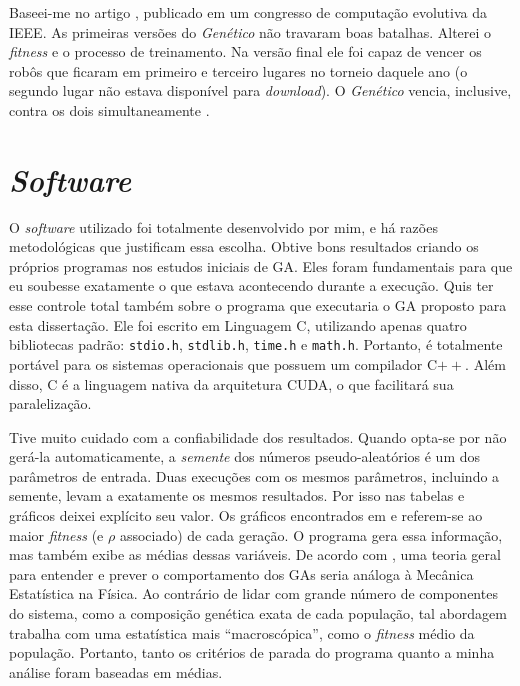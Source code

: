 	Baseei-me no artigo \cite{robocodeGA}, publicado em um congresso de computação evolutiva da IEEE. As primeiras versões do \emph{Genético} não travaram boas batalhas. Alterei o \emph{fitness} e o processo de treinamento. Na versão final ele foi capaz de vencer os robôs que ficaram em primeiro e terceiro lugares no torneio daquele ano (o segundo lugar não estava disponível para \emph{download}). O \emph{Genético} vencia, inclusive, contra os dois simultaneamente \cite{robocodeGA_adriano}.
	

\section{\emph{Software}}

	O \emph{software} utilizado foi totalmente desenvolvido por mim, e há razões metodológicas que justificam essa escolha. Obtive bons resultados criando os próprios programas nos estudos iniciais de GA. Eles foram fundamentais para que eu soubesse exatamente o que estava acontecendo durante a execução. Quis ter esse controle total também sobre o programa que executaria o GA proposto para esta dissertação. Ele foi escrito em Linguagem C, utilizando apenas quatro bibliotecas padrão: \texttt{stdio.h}, \texttt{stdlib.h}, \texttt{time.h} e \texttt{math.h}. Portanto, é totalmente portável para os sistemas operacionais que possuem um compilador C$++$. Além disso, C é a linguagem nativa da arquitetura CUDA, o que facilitará sua paralelização.
	
	Tive muito cuidado com a confiabilidade dos resultados. Quando opta-se por não gerá-la automaticamente, a \emph{semente} dos números pseudo-aleatórios é um dos parâmetros de entrada. Duas execuções com os mesmos parâmetros, incluindo a semente, levam a exatamente os mesmos resultados. Por isso nas tabelas e gráficos deixei explícito seu valor. Os gráficos encontrados em \cite{metodo2004} e \cite{metodo2011} referem-se ao maior \emph{fitness} (e $\rho$ associado) de cada geração. O programa gera essa informação, mas também exibe as médias dessas variáveis. De acordo com \cite{Mitchell98}, uma teoria geral para entender e prever o comportamento dos GAs seria análoga à Mecânica Estatística na Física. Ao contrário de lidar com grande número de componentes do sistema, como a composição genética exata de cada população, tal abordagem trabalha com uma estatística mais ``macroscópica'', como o \emph{fitness} médio da população. Portanto, tanto os critérios de parada do programa quanto a minha análise foram baseadas em médias.
	
